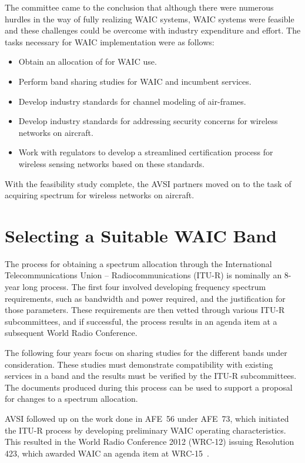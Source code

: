 The committee came to the conclusion that although there were numerous hurdles in the way of fully realizing WAIC systems, WAIC systems were feasible and these challenges could be overcome with industry expenditure and effort. The tasks necessary for WAIC implementation were as follows: 
\begin{itemize}
\item Obtain an allocation of for WAIC use.
\item Perform band sharing studies for WAIC and incumbent services.
\item Develop industry standards for channel modeling of air-frames.
\item Develop industry standards for addressing security concerns for wireless networks on aircraft.
\item Work with regulators to develop a streamlined certification process for wireless sensing networks based on these standards.
\end{itemize}
 
With the feasibility study complete, the AVSI partners moved on to the task of acquiring spectrum for wireless networks on aircraft. 
 
\section{Selecting a Suitable WAIC Band}
The process for obtaining a spectrum allocation through the International Telecommunications Union -- Radiocommunications (ITU-R) is nominally an 8-year long process. The first four involved developing frequency spectrum requirements, such as bandwidth and power required, and the justification for those parameters. These requirements are then vetted through various ITU-R subcommittees, and if successful, the process results in an agenda item at a subsequent World Radio Conference.  

The following four years focus on sharing studies for the different bands under consideration. These studies must demonstrate compatibility with existing services in a band and the results must be verified by the ITU-R subcommittees. The documents produced during this process can be used to support a proposal for changes to a spectrum allocation. 

AVSI followed up on the work done in AFE~56 under AFE~73, which initiated the ITU-R process by developing preliminary WAIC operating characteristics. This resulted in the World Radio Conference 2012 (WRC-12) issuing Resolution 423, which awarded WAIC an agenda item at WRC-15~\cite{noauthor_consideration_2012}.

